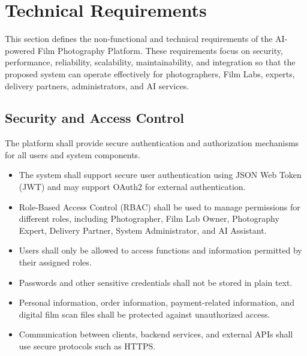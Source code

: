 
\section{Technical Requirements}

This section defines the non-functional and technical requirements of the
AI-powered Film Photography Platform. These requirements focus on security,
performance, reliability, scalability, maintainability, and integration so
that the proposed system can operate effectively for photographers, Film Labs,
experts, delivery partners, administrators, and AI services.

\subsection{Security and Access Control}

The platform shall provide secure authentication and authorization mechanisms
for all users and system components.

\begin{itemize}
    \item The system shall support secure user authentication using JSON Web
    Token (JWT) and may support OAuth2 for external authentication.

    \item Role-Based Access Control (RBAC) shall be used to manage permissions
    for different roles, including Photographer, Film Lab Owner,
    Photography Expert, Delivery Partner, System Administrator, and AI
    Assistant.

    \item Users shall only be allowed to access functions and information
    permitted by their assigned roles.

    \item Passwords and other sensitive credentials shall not be stored in
    plain text.

    \item Personal information, order information, payment-related information,
    and digital film scan files shall be protected against unauthorized access.

    \item Communication between clients, backend services, and external APIs
    shall use secure protocols such as HTTPS.
\end{itemize}

